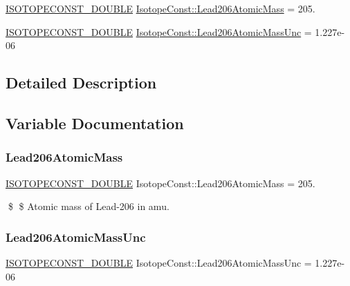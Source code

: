 \begin{DoxyCompactItemize}
\item 
\mbox{\hyperlink{group___isotope_const-_macros_ga8f45a7272ce02c0b4c65c44636ed719a}{I\+S\+O\+T\+O\+P\+E\+C\+O\+N\+S\+T\+\_\+\+D\+O\+U\+B\+LE}} \mbox{\hyperlink{group___isotope_const-_lead-_pb206_gac06c0b4dafd1e3d4a5452d4b7bd248ae}{Isotope\+Const\+::\+Lead206\+Atomic\+Mass}} = 205.
\item 
\mbox{\hyperlink{group___isotope_const-_macros_ga8f45a7272ce02c0b4c65c44636ed719a}{I\+S\+O\+T\+O\+P\+E\+C\+O\+N\+S\+T\+\_\+\+D\+O\+U\+B\+LE}} \mbox{\hyperlink{group___isotope_const-_lead-_pb206_ga68e17655833b6035ec8867e8e37c8bc6}{Isotope\+Const\+::\+Lead206\+Atomic\+Mass\+Unc}} = 1.\+227e-\/06
\end{DoxyCompactItemize}


\subsection{Detailed Description}


\subsection{Variable Documentation}
\mbox{\label{group___isotope_const-_lead-_pb206_gac06c0b4dafd1e3d4a5452d4b7bd248ae}} 
\subsubsection{\texorpdfstring{Lead206\+Atomic\+Mass}{Lead206AtomicMass}}
{\footnotesize\ttfamily \mbox{\hyperlink{group___isotope_const-_macros_ga8f45a7272ce02c0b4c65c44636ed719a}{I\+S\+O\+T\+O\+P\+E\+C\+O\+N\+S\+T\+\_\+\+D\+O\+U\+B\+LE}} Isotope\+Const\+::\+Lead206\+Atomic\+Mass = 205.}

\$ \$ Atomic mass of Lead-\/206 in amu. \mbox{\label{group___isotope_const-_lead-_pb206_ga68e17655833b6035ec8867e8e37c8bc6}} 
\subsubsection{\texorpdfstring{Lead206\+Atomic\+Mass\+Unc}{Lead206AtomicMassUnc}}
{\footnotesize\ttfamily \mbox{\hyperlink{group___isotope_const-_macros_ga8f45a7272ce02c0b4c65c44636ed719a}{I\+S\+O\+T\+O\+P\+E\+C\+O\+N\+S\+T\+\_\+\+D\+O\+U\+B\+LE}} Isotope\+Const\+::\+Lead206\+Atomic\+Mass\+Unc = 1.\+227e-\/06}

